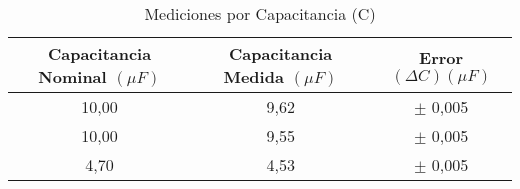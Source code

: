 \documentclass{article}
\begin{document}
\begin{table}[h!]
    \centering
    \begin{tabular}{|c|c|c|}
        \hline
       Capacitancia Nominal $(\mu F)$ & Capacitancia Medida $(\mu F)$ & Error $(\Delta C) (\mu F)$ \\ \hline
       10,00 & 9,62 & $\pm$ 0,005 \\ 
       10,00 & 9,55 & $\pm$ 0,005 \\
       4,70 & 4,53 & $\pm$ 0,005 \\ \hline
    \end{tabular}
    \caption{Mediciones por Capacitancia (C)}
    \label{tab:my_label}
\end{table}
\end{document}
